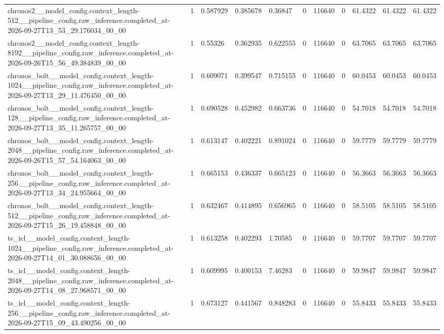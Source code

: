 \begin{tabular}{lllllllllll}
chronos2\_\_model\_config.context\_length-512\_\_pipeline\_config.raw\_inference.completed\_at-2026-09-27T13\_53\_29.176034\_00\_00 & 1 & 0.587929 & 0.385678 & 0.36847 & 0 & 116640 & 0 & 61.4322 & 61.4322 & 61.4322 \\
chronos2\_\_model\_config.context\_length-8192\_\_pipeline\_config.raw\_inference.completed\_at-2026-09-26T15\_56\_49.384839\_00\_00 & 1 & 0.55326 & 0.362935 & 0.622555 & 0 & 116640 & 0 & 63.7065 & 63.7065 & 63.7065 \\
chronos\_bolt\_\_model\_config.context\_length-1024\_\_pipeline\_config.raw\_inference.completed\_at-2026-09-27T13\_29\_11.476450\_00\_00 & 1 & 0.609071 & 0.399547 & 0.715155 & 0 & 116640 & 0 & 60.0453 & 60.0453 & 60.0453 \\
chronos\_bolt\_\_model\_config.context\_length-128\_\_pipeline\_config.raw\_inference.completed\_at-2026-09-27T13\_35\_11.265757\_00\_00 & 1 & 0.690528 & 0.452982 & 0.663736 & 0 & 116640 & 0 & 54.7018 & 54.7018 & 54.7018 \\
chronos\_bolt\_\_model\_config.context\_length-2048\_\_pipeline\_config.raw\_inference.completed\_at-2026-09-26T15\_57\_54.164063\_00\_00 & 1 & 0.613147 & 0.402221 & 0.891024 & 0 & 116640 & 0 & 59.7779 & 59.7779 & 59.7779 \\
chronos\_bolt\_\_model\_config.context\_length-256\_\_pipeline\_config.raw\_inference.completed\_at-2026-09-27T13\_34\_24.955664\_00\_00 & 1 & 0.665153 & 0.436337 & 0.665123 & 0 & 116640 & 0 & 56.3663 & 56.3663 & 56.3663 \\
chronos\_bolt\_\_model\_config.context\_length-512\_\_pipeline\_config.raw\_inference.completed\_at-2026-09-27T15\_26\_19.458848\_00\_00 & 1 & 0.632467 & 0.414895 & 0.656965 & 0 & 116640 & 0 & 58.5105 & 58.5105 & 58.5105 \\
ts\_icl\_\_model\_config.context\_length-1024\_\_pipeline\_config.raw\_inference.completed\_at-2026-09-27T14\_01\_30.088656\_00\_00 & 1 & 0.613258 & 0.402293 & 1.70585 & 0 & 116640 & 0 & 59.7707 & 59.7707 & 59.7707 \\
ts\_icl\_\_model\_config.context\_length-2048\_\_pipeline\_config.raw\_inference.completed\_at-2026-09-27T14\_08\_27.968571\_00\_00 & 1 & 0.609995 & 0.400153 & 7.46283 & 0 & 116640 & 0 & 59.9847 & 59.9847 & 59.9847 \\
ts\_icl\_\_model\_config.context\_length-256\_\_pipeline\_config.raw\_inference.completed\_at-2026-09-27T15\_09\_43.490256\_00\_00 & 1 & 0.673127 & 0.441567 & 0.848283 & 0 & 116640 & 0 & 55.8433 & 55.8433 & 55.8433 \\

\end{tabular}
